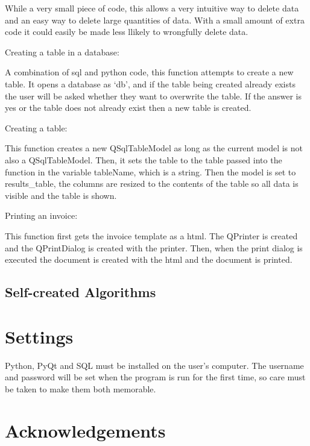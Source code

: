 While a very small piece of code, this allows a very intuitive way to delete data and an easy way to delete large quantities of data. With a small amount of extra code it could easily be made less llikely to wrongfully delete data.

Creating a table in a database:

A combination of sql and python code, this function attempts to create a new table. It opens a database as `db', and if the table being created already exists the user will be asked whether they want to overwrite the table. If the answer is yes or the table does not already exist then a new table is created. 

Creating a table:

This function creates a new QSqlTableModel as long as the current model is not also a QSqlTableModel. Then, it sets the table to the table passed into the function in the variable tableName, which is a string. Then the model is set to results\_table, the columns are resized to the contents of the table so all data is visible and the table is shown.

Printing an invoice:

This function first gets the invoice template as a html. The QPrinter is created and the QPrintDialog is created with the printer.  Then, when the print dialog is executed the document is created with the html and the document is printed.

\subsection{Self-created Algorithms}

\section{Settings}

Python, PyQt and SQL must be installed on the user's computer. The username and password will be set when the program is run for the first time, so care must be taken to make them both memorable.

\section{Acknowledgements}

